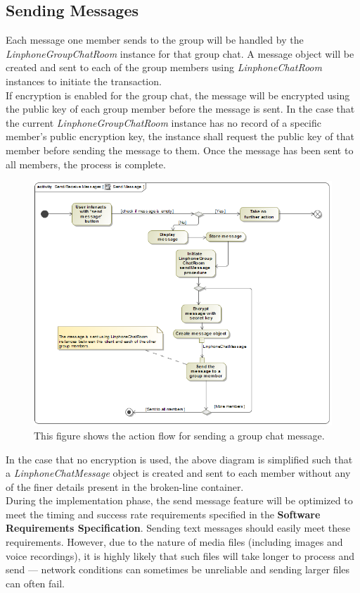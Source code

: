 \documentclass[11pt]{article}
\begin{document}
\subsection{Sending Messages}
Each message one member sends to the group will be handled by the \textit{LinphoneGroupChatRoom} instance for that group chat. A message object will be created and sent to each of the group members using \textit{LinphoneChatRoom} instances to initiate the transaction.\\
If encryption is enabled for the group chat, the message will be encrypted using the public key of each group member before the message is sent. In the case that the current \textit{LinphoneGroupChatRoom} instance has no record of a specific member's public encryption key, the instance shall request the public key of that member before sending the message to them. Once the message has been sent to all members, the process is complete.
\begin{figure}[H]
\centering
\includegraphics[width=5in]{./images/activity_send_message.png}
\caption[Send Message Activity Diagram]{This figure shows the action flow for sending a group chat message.}
\label{ad-send-message}
\end{figure}
In the case that no encryption is used, the above diagram is simplified such that a \textit{LinphoneChatMessage} object is created and sent to each member without any of the finer details present in the broken-line container.\\

During the implementation phase, the send message feature will be optimized to meet the timing and success rate requirements specified in the \textbf{Software Requirements Specification}. Sending text messages should easily meet these requirements. However, due to the nature of media files (including images and voice recordings), it is highly likely that such files will take longer to process and send --- network conditions can sometimes be unreliable and sending larger files can often fail.
\end{document}
